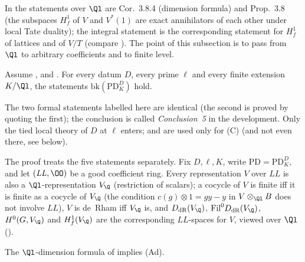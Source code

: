 In \cite{BlochKato1990} the statements over $\Ql$ are Cor.~3.8.4 (dimension formula) and Prop.~3.8 (the subspaces $H^1_f$ of $V$
and $V^*(1)$ are exact annihilators of each other under local Tate duality); the integral statement is the corresponding
statement for $H^1_f$ of lattices and of $V/T$ (compare \cite[\S3]{BlochKato1990}). The point of this subsection is to pass from $\Ql$
to arbitrary coefficients and to finite level.

\begin{theorem}\label{pf:sh-hodge:bkall}
Assume \shhodgeBK, \shhodgeLTD{} and \shhodgeLEC. For every datum $D$, every prime $\ell$ and every finite extension $K/\Ql$, the
statements $\mathrm{bk}(\mathrm{PD}^D_K)$ hold.
\end{theorem}

\begin{remark}\label{pf:sh-hodge:bkrem}
The two formal statements labelled here are identical (the second is proved by quoting the first); the conclusion is called
\emph{Conclusion~5} in the development. Only the tied local theory of $D$ at $\ell$ enters; \shhodgeLTD{} and \shhodgeLEC{} are used only
for (C) (and \shhodgeLEC{} not even there, see below).
\end{remark}

The proof treats the five statements separately. Fix $D,\ell,K$, write $\mathrm{PD}=\mathrm{PD}^D_K$, and let $(\mathit{LL},\OO)$ be a good
coefficient ring. Every representation $V$ over $\mathit{LL}$ is also a $\Ql$-representation $V_{\Q}$ (restriction of scalars); a cocycle
of $V$ is finite iff it is finite as a cocycle of $V_\Q$ (the condition $c(g)\otimes1=gy-y$ in $V\otimes_{\Ql}B$ does not involve
$\mathit{LL}$), $V$ is de~Rham iff $V_\Q$ is, and $D_{\mathrm{dR}}(V_\Q)$, $\mathrm{Fil}^0D_{\mathrm{dR}}(V_\Q)$, $H^0(G,V_\Q)$ and
$\shhodgeHf(V_\Q)$ are the corresponding $\mathit{LL}$-spaces for $V$, viewed over $\Ql$
().

\begin{lemma}\label{pf:sh-hodge:bkdim}
The $\Ql$-dimension formula of \shhodgeBK{} implies (Ad).
\end{lemma}

